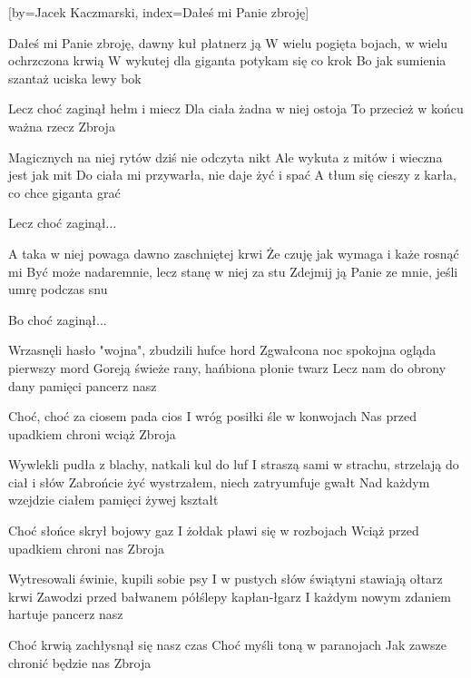 [by={Jacek Kaczmarski},
                     index={Dałeś mi Panie zbroję}]
\beginverse

Dałeś mi Panie zbroję, dawny kuł płatnerz ją
W wielu pogięta bojach, w wielu ochrzczona krwią
W wykutej dla giganta potykam się co krok
Bo jak sumienia szantaż uciska lewy bok

\endverse
\beginverse

Lecz choć zaginął hełm i miecz
Dla ciała żadna w niej ostoja
To przecież w końcu ważna rzecz
Zbroja

\endverse
\beginverse

Magicznych na niej rytów dziś nie odczyta nikt
Ale wykuta z mitów i wieczna jest jak mit
Do ciała mi przywarła, nie daje żyć i spać
A tłum się cieszy z karła, co chce giganta grać

\endverse
\beginverse

Lecz choć zaginął...

\endverse
\beginverse

A taka w niej powaga dawno zaschniętej krwi
Że czuję jak wymaga i każe rosnąć mi
Być może nadaremnie, lecz stanę w niej za stu
Zdejmij ją Panie ze mnie, jeśli umrę podczas snu

\endverse
\beginverse

Bo choć zaginął...

\endverse
\beginverse

Wrzasnęli hasło "wojna", zbudzili hufce hord
Zgwałcona noc spokojna ogląda pierwszy mord
Goreją świeże rany, hańbiona płonie twarz
Lecz nam do obrony dany pamięci pancerz nasz

\endverse
\beginverse

Choć, choć za ciosem pada cios
I wróg posiłki śle w konwojach
Nas przed upadkiem chroni wciąż
Zbroja

\endverse
\beginverse

Wywlekli pudła z blachy, natkali kul do luf
I straszą sami w strachu, strzelają do ciał i słów
Zabrońcie żyć wystrzałem, niech zatryumfuje gwałt
Nad każdym wzejdzie ciałem pamięci żywej kształt

\endverse
\beginverse

Choć słońce skrył bojowy gaz
I żołdak pławi się w rozbojach
Wciąż przed upadkiem chroni nas
Zbroja

\endverse
\beginverse

Wytresowali świnie, kupili sobie psy
I w pustych słów świątyni stawiają ołtarz krwi
Zawodzi przed bałwanem półślepy kapłan-łgarz
I każdym nowym zdaniem hartuje pancerz nasz

\endverse
\beginverse

Choć krwią zachłysnął się nasz czas
Choć myśli toną w paranojach
Jak zawsze chronić będzie nas
Zbroja

\endverse
\endsong